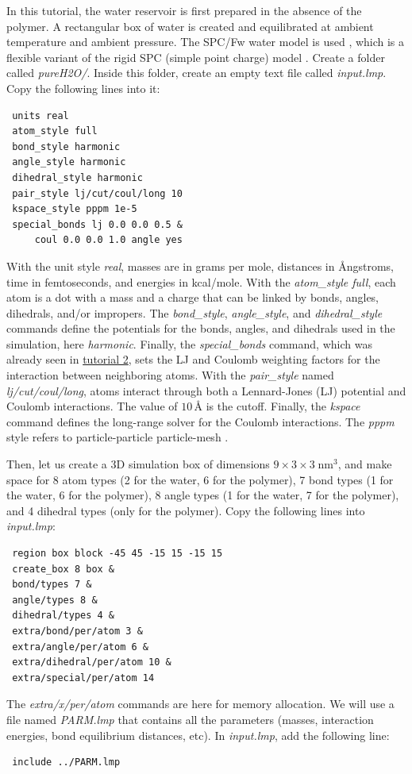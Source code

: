 \documentclass[9pt,tutorial]{livecoms}
\begin{document}
In this tutorial, the water reservoir is first prepared in the absence of the polymer.
A rectangular box of water is created and equilibrated at ambient temperature and
ambient pressure. The SPC/Fw water model is used \cite{wu2006flexible}, which is
a flexible variant of the rigid SPC (simple point charge) model \cite{berendsen1981interaction}.
Create a folder called \textit{pureH2O/}. Inside this folder, create an empty text
file called \textit{input.lmp}. Copy the following lines into it:
{\normalsize \begin{verbatim}
 units real
 atom_style full
 bond_style harmonic
 angle_style harmonic
 dihedral_style harmonic
 pair_style lj/cut/coul/long 10
 kspace_style pppm 1e-5
 special_bonds lj 0.0 0.0 0.5 &
     coul 0.0 0.0 1.0 angle yes
\end{verbatim}}
With the unit style \textit{real}, masses are in grams per mole, distances in
Ångstroms, time in femtoseconds, and energies in kcal/mole. With the \textit{atom\_style full}, each atom is a dot with a mass and a charge that can be linked by bonds, angles, dihedrals, and/or impropers. The \textit{bond\_style},
\textit{angle\_style}, and \textit{dihedral\_style} commands define the potentials
for the bonds, angles, and dihedrals used in the simulation, here \textit{harmonic}.
Finally, the \textit{special\_bonds} command, which was already seen in
\hyperref[carbon-nanotube-label]{tutorial 2}, sets the LJ and Coulomb weighting
factors for the interaction between neighboring atoms. With the \textit{pair\_style}
named \textit{lj/cut/coul/long}, atoms interact through both a Lennard-Jones (LJ)
potential and Coulomb interactions. The value of $10\,\text{\AA{}}$ is the cutoff.
Finally, the \textit{kspace} command defines the long-range solver for the Coulomb
interactions. The \textit{pppm} style refers to particle-particle particle-mesh \cite{luty1996calculating}.

Then, let us create a 3D simulation box of dimensions $9 \times 3 \times 3 \; \text{nm}^3$,
and make space for 8 atom types (2 for the water, 6 for the polymer), 7 bond types
(1 for the water, 6 for the polymer), 8 angle types (1 for the water, 7 for the polymer),
and 4 dihedral types (only for the polymer). Copy the following lines into \textit{input.lmp}:
{\normalsize \begin{verbatim}
 region box block -45 45 -15 15 -15 15
 create_box 8 box &
 bond/types 7 &
 angle/types 8 &
 dihedral/types 4 &
 extra/bond/per/atom 3 &
 extra/angle/per/atom 6 &
 extra/dihedral/per/atom 10 &
 extra/special/per/atom 14
\end{verbatim}}
The \textit{extra/x/per/atom} commands are here for
memory allocation. We will use a file named \textit{PARM.lmp} that contains
all the parameters (masses, interaction energies, bond equilibrium
distances, etc). In \textit{input.lmp}, add the following line:
{\normalsize \begin{verbatim}
 include ../PARM.lmp
\end{verbatim}}
\end{document}
